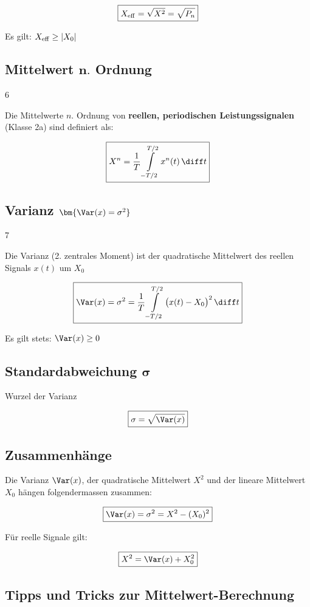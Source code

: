 $$ \boxed{ X_{\rm eff} = \sqrt{X^2} = \sqrt{P_n}} $$

Es gilt: $X_{\rm eff} \geq \vert X_0 \vert$


\subsection[Mittelwert n. Ordnung]{Mittelwert $\bm{n.}$ Ordnung}{6}

Die Mittelwerte $n.$ Ordnung von \textbf{reellen, periodischen Leistungssignalen} (Klasse 2a) sind definiert als:

$$ \boxed{ X^n = \frac{1}{T} \int\limits_{-T/2}^{T/2} x^n(t) \, \diff t } $$


\subsection[Varianz]{Varianz $\bm{\Var(x) = \sigma^2}$}{7}

Die Varianz (2. zentrales Moment) ist der quadratische Mittelwert des reellen Signals $x(t)$ um $X_0$ 

$$ \boxed{ \Var(x) = \sigma^2 = \frac{1}{T} \int\limits_{-T/2}^{T/2} \big( x(t) - X_0 \big)^2  \, \diff t } $$

Es gilt stets: $\Var(x) \geq 0$


\subsection[Standardabweichung]{Standardabweichung $\bm{\sigma}$}

Wurzel der Varianz

$$ \boxed{ \sigma = \sqrt{\Var(x)} } $$


\subsection{Zusammenhänge}

Die Varianz $\Var(x)$, der quadratische Mittelwert $X^2$ und der lineare Mittelwert $X_0$ hängen folgendermassen zusammen:

$$ \boxed{ \Var(x) = \sigma^2 = X^2 - (X_0)^2 } $$

Für reelle Signale gilt:

$$ \boxed{ X^2  = \Var(x) + X_0^2 } $$


\subsection{Tipps und Tricks zur Mittelwert-Berechnung}

